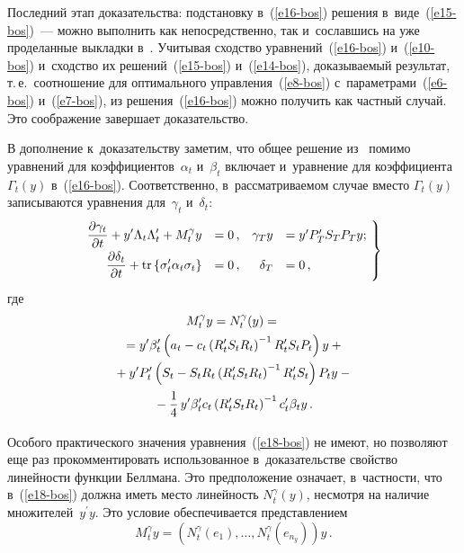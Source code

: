\begin{multicols}{2}
     Последний этап доказательства:  подстановку в~(\ref{e16-bos}) 
решения в~виде~(\ref{e15-bos})~--- можно выполнить как непосредственно, 
так и~сославшись на уже проделанные выкладки в~\cite{3-bos}. Учитывая 
сходство уравнений~(\ref{e16-bos}) и~(\ref{e10-bos}) и~сходство их 
решений~(\ref{e15-bos}) и~(\ref{e14-bos}), доказываемый результат, т.\,е.\ 
соотношение для оптимального управления~(\ref{e8-bos}) 
с~параметрами~(\ref{e6-bos}) и~(\ref{e7-bos}), из решения~(\ref{e16-bos}) 
можно получить как частный случай. Это соображение завершает 
доказательство.

\smallskip
     
     В дополнение к~доказательству заметим, что \mbox{общее} решение  
из~\cite{3-bos} помимо уравнений для коэффициентов~$\alpha_t$ и~$\beta_t$ 
включает и~уравнение для коэффициента $\Gamma_t(y)$ в~(\ref{e16-bos}). 
Соответственно, в~рассматриваемом случае вместо $\Gamma_t(y)$ 
записываются уравнения для~$\gamma_t$ и~$\delta_t$:
     \begin{equation}
     \left.
     \begin{array}{rlrl}
     \hspace*{-3mm}\fr{\partial \gamma_t}{\partial t} +y^\prime \Lambda_t 
\Lambda_t^\prime+M_t^\gamma y&=0\,,& \gamma_T y&= y^\prime 
P_T^\prime S_T P_T y;\\[6pt]
\fr{\partial \delta_t}{\partial t} +\mathrm{tr}\left\{ \sigma_t^\prime \alpha_t 
\sigma_t\right\}&=0\,, & \delta_T&=0\,,
\end{array}\!
\right\}\!\!
 \label{e18-bos}
 \end{equation}
 где
 \begin{multline*}
     M_t^\gamma y = N_t^\gamma(y) ={}\\
    {}=y^\prime \beta_t^\prime \left( a_t-
c_t\left( R_t^\prime S_t R_t\right)^{-1} R_t^\prime S_t P_t\right) y+{}\\
    {}+y^\prime P_t^\prime \left( S_t-S_t R_t\left( R_t^\prime S_t R_t\right)^{-
1} R_t^\prime S_t\right) P_t y-{}\\
{}-
     \displaystyle\frac{\displaystyle 1\mathstrut}{\displaystyle 4\mathstrut} \,y^\prime \beta_t^\prime c_t\left( R_t^\prime S_t R_t\right)^{-1} 
c_t^\prime \beta_t y\,.
          \end{multline*}
     

     Особого практического значения уравнения~(\ref{e18-bos}) не имеют, 
но позволяют еще раз прокомментировать использованное в~доказательстве 
свойство линейности функции Беллмана. Это предположение означает, 
в~частности, что в~(\ref{e18-bos}) должна иметь место линейность 
$N_t^\gamma(y)$, несмотря на наличие множителей~$y^\prime y$. Это 
условие обеспечивается пред\-став\-ле\-нием 
$$
M_t^\gamma y = \left(  N_t^\gamma\left(e_1\right),\ldots , N_t^\gamma\left(e_{n_y}\right)\right) y\,.
$$ 


\end{multicols}
